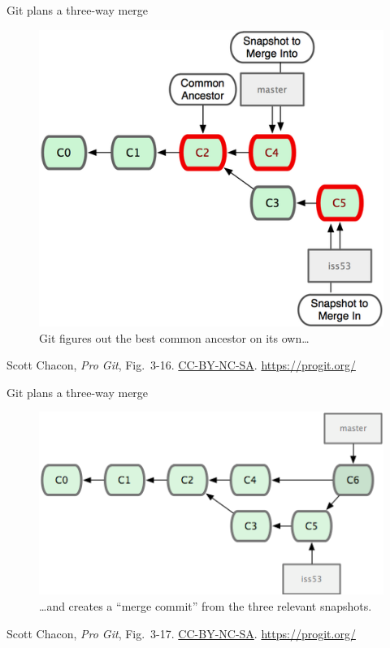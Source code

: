 \begin{frame}{Git plans a three-way merge}
  \begin{figure}
    \includegraphics[scale=0.8]{18333fig0316-tn.png}
    \\ Git figures out the best common ancestor on its own\ldots
  \end{figure}
  \footnotesize{Scott Chacon,
    \emph{Pro Git},
    Fig.~3-16.
    \href{https://creativecommons.org/licenses/by-nc-sa/3.0/legalcode}{CC-BY-NC-SA}.
    \href{https://progit.org/}{https://progit.org/}}
\end{frame}

\begin{frame}{Git plans a three-way merge}
  \begin{figure}
    \includegraphics[scale=0.8]{18333fig0317-tn.png}
    \\ \ldots and creates a ``merge commit'' from the three relevant snapshots.
  \end{figure}
  \footnotesize{Scott Chacon,
    \emph{Pro Git},
    Fig.~3-17.
    \href{https://creativecommons.org/licenses/by-nc-sa/3.0/legalcode}{CC-BY-NC-SA}.
    \href{https://progit.org/}{https://progit.org/}}
\end{frame}

